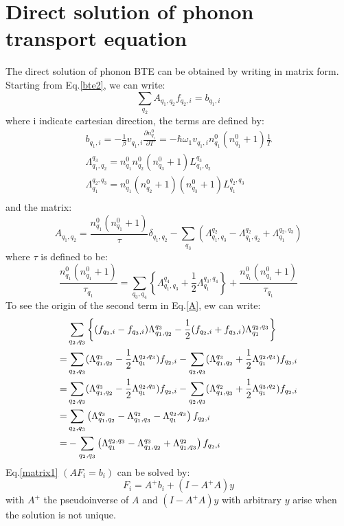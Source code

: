 \documentclass{article}
\newcommand{\pfrac}[2]{\frac{\partial #1}{\partial #2}}
\begin{document}
\pagebreak
\section{Direct solution of phonon transport equation}
The direct solution of phonon BTE can be obtained by writing in matrix form. Starting from
Eq.\ref{bte2}, we can write:
\begin{equation}
    \sum_{q_2} A_{q_1,q_2} f_{q_2,i} = b_{q_1,i} \label{matrix1}
\end{equation}
where i indicate cartesian direction, the terms are defined by:
\begin{gather}
    b_{q_1,i} = - \frac{1}{\beta} v_{q_1,i} \pfrac{n_{q_1}^0}{T} = -\hbar \omega_1 v_{q_1,i} n_{q_1}^0 (n_{q_1}^0 + 1) \frac{1}{T} \\
    \Lambda_{q_1,q_2}^{q_3} = n_{q_1}^0 n_{q_2}^0 (n_{q_3}^0 + 1) L_{q_1,q_2}^{q_3} \\
    \Lambda^{q_2,q_3}_{q_1} = n_{q_1}^0 (n_{q_2}^0+1) (n_{q_3}^0 + 1) L^{q_2,q_3}_{q_1} \\
\end{gather}
and the matrix:
\begin{equation}
    A_{q_1,q_2} = \frac{n_{q_1}^0 (n_{q_1}^0 + 1)}{\tau} \delta_{q_1,q_2} 
            - \sum_{q_3} \left( \Lambda_{q_1,q_3}^{q_2} -  \Lambda_{q_1,q_2}^{q_2} + \Lambda^{q_2,q_3}_{q_1} \right) \label{A}
\end{equation}
where $\tau$ is defined to be:
\begin{equation}
    \frac{n_{q_1}^0 (n_{q_1}^0 + 1)}{\tau_{q_1}} = 
    \sum_{q_3,q_4} \left\{ \Lambda_{q_1,q_3}^{q_{4}} + \frac{1}{2} \Lambda^{q_3,q_{4}}_{q_1} \right\} 
    + \frac{n_{q_1}^0(n_{q_1}^0+1)}{\tau_{q_1}}
\end{equation}
To see the origin of the second term in Eq.\ref{A}, ew can write:
\begin{align}
        &\sum_{q_2,q_3} \left\{ (f_{q_2,i} - f_{q_3,i}) \Lambda_{q_1,q_2}^{q_3} - \frac{1}{2} (f_{q_2,i} + f_{q_3,i}) \Lambda_{q_1}^{q_2,q_3}  \right\} \notag \\
    = &\sum_{q_2,q_3} (\Lambda_{q_1,q_2}^{q_3} - \frac{1}{2}\Lambda_{q_1}^{q_2,q_3} ) f_{q_2,i} 
        - \sum_{q_2,q_3} (\Lambda_{q_1,q_2}^{q_3} + \frac{1}{2}\Lambda_{q_1}^{q_2,q_3} ) f_{q_3,i} \notag \\ 
    = &\sum_{q_2,q_3} (\Lambda_{q_1,q_2}^{q_3} - \frac{1}{2}\Lambda_{q_1}^{q_2,q_3} ) f_{q_2,i} 
        - \sum_{q_2,q_3} (\Lambda_{q_1,q_3}^{q_2} + \frac{1}{2}\Lambda_{q_1}^{q_3,q_2} ) f_{q_2,i} \notag \\ 
    = &\sum_{q_2,q_3} \left( \Lambda_{q_1,q_2}^{q_3} - \Lambda_{q_1,q_3}^{q_2} - \Lambda_{q_1}^{q_2,q_3} \right) f_{q_2,i} \notag \\
    = &- \sum_{q_2,q_3} \left( \Lambda_{q_1}^{q_2,q_3} - \Lambda_{q_1,q_2}^{q_3} + \Lambda_{q_1,q_3}^{q_2} \right) f_{q_2,i}
\end{align}
Eq.\ref{matrix1} $(AF_i = b_i)$ can be solved by:
\begin{equation}
    F_i = A^{+}b_i + (I - A^{+}A) y
\end{equation}
with $A^{+}$ the pseudoinverse of $A$ and $(I - A^{+}A) y$ with arbitrary $y$ arise
when the solution is not unique.
\end{document}
